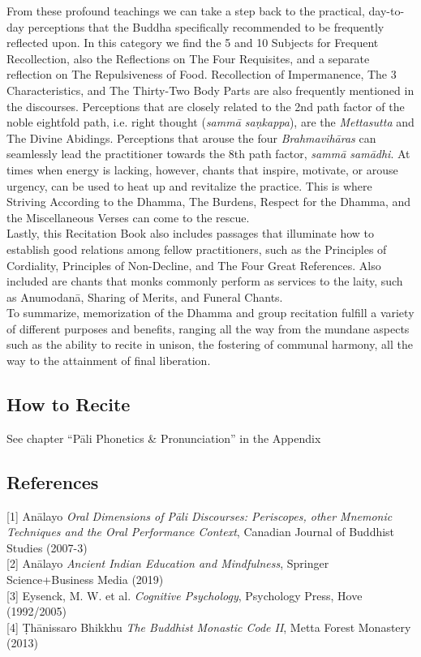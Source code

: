 From these profound teachings we can take a step back to the practical, day-to-day perceptions that the Buddha specifically recommended to be frequently reflected upon. In this category we find the 5 and 10 Subjects for Frequent Recollection, also the Reflections on The Four Requisites, and a separate reflection on The Repulsiveness of Food. Recollection of Impermanence, The 3 Characteristics, and The Thirty-Two Body Parts are also frequently mentioned in the discourses. Perceptions that are closely related to the 2nd path factor of the noble eightfold path, i.e. right thought (\textit{sammā saṇkappa}), are the \textit{Mettasutta} and The Divine Abidings. Perceptions that arouse the four \textit{Brahmavihāras} can seamlessly lead the practitioner towards the 8th path factor, \textit{sammā samādhi}. At times when energy is lacking, however, chants that inspire, motivate, or arouse urgency, can be used to heat up and revitalize the practice. This is where Striving According to the Dhamma, The Burdens, Respect for the Dhamma, and the Miscellaneous Verses can come to the rescue.\\

Lastly, this Recitation Book also includes passages that illuminate how to establish good relations among fellow practitioners, such as the Principles of Cordiality, Principles of Non-Decline, and The Four Great References. Also included are chants that monks commonly perform as services to the laity, such as Anumodanā, Sharing of Merits, and Funeral Chants.\\

To summarize, memorization of the Dhamma and group recitation fulfill a variety of different purposes and benefits, ranging all the way from the mundane aspects such as the ability to recite in unison, the fostering of communal harmony, all the way to the attainment of final liberation.\\

\subsection*{How to Recite}

See chapter ``Pāli Phonetics \& Pronunciation'' in the Appendix\\

\subsection*{References}
[1] Anālayo \textit{Oral Dimensions of Pāli Discourses: Periscopes, other Mnemonic Techniques and the Oral Performance Context}, Canadian Journal of Buddhist Studies (2007-3)\\

[2] Anālayo \textit{Ancient Indian Education and Mindfulness}, Springer Science+Business Media (2019)\\

[3] Eysenck, M. W. et al. \textit{Cognitive Psychology}, Psychology Press, Hove (1992/2005)\\

[4] Ṭhānissaro Bhikkhu \textit{The Buddhist Monastic Code II}, Metta Forest Monastery (2013)
